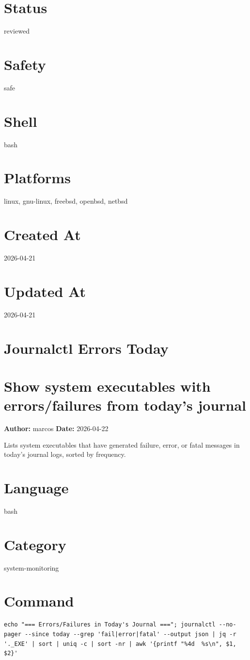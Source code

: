 \documentclass[openany]{book}
\begin{document}
\section*{Status}
reviewed

\section*{Safety}
safe

\section*{Shell}
bash

\section*{Platforms}
linux, gnu-linux, freebsd, openbsd, netbsd

\section*{Created At}
2026-04-21

\section*{Updated At}
2026-04-21

\section{Journalctl Errors Today}
\section*{Show system executables with errors/failures from today's journal}
\textbf{Author:} marcos \hfill \textbf{Date:} 2026-04-22

\noindent Lists system executables that have generated failure, error, or fatal messages in today's journal logs, sorted by frequency.

\section*{Language}
bash

\section*{Category}
system-monitoring

\section*{Command}
\begin{lstlisting}
echo "=== Errors/Failures in Today's Journal ==="; journalctl --no-pager --since today --grep 'fail|error|fatal' --output json | jq -r '._EXE' | sort | uniq -c | sort -nr | awk '{printf "%4d  %s\n", $1, $2}'
\end{lstlisting}
\end{document}
